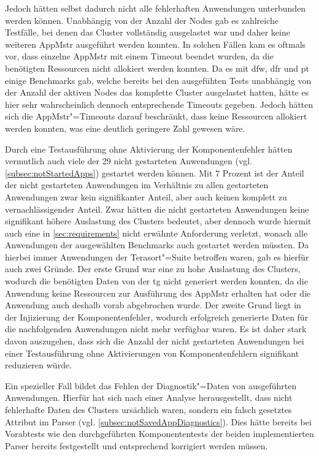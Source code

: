 Jedoch hätten selbst dadurch \uU nicht alle fehlerhaften Anwendungen unterbunden werden können.
Unabhängig von der Anzahl der Nodes gab es zahlreiche Testfälle, bei denen das Cluster vollständig ausgelastet war und daher keine weiteren \gls{AppMstr} ausgeführt werden konnten.
In solchen Fällen kam es oftmals vor, dass einzelne \gls{AppMstr} mit einem Timeout beendet wurden, da die benötigten Ressourcen nicht allokiert werden konnten.
Da es mit \acrlong{dfw}, \acrlong{dfr} und \acrlong{pt} einige Benchmarks gab, welche bereits bei den ausgefühten Tests unabhängig von der Anzahl der aktiven Nodes das komplette Cluster ausgelastet hatten, hätte es hier sehr wahrscheinlich dennoch entsprechende Timeouts gegeben.
Jedoch hätten sich die \gls{AppMstr}"=Timeouts darauf beschränkt, dass keine Ressourcen allokiert werden konnten, was eine deutlich geringere Zahl gewesen wäre.

Durch eine Testausführung ohne Aktivierung der Komponentenfehler hätten vermutlich auch viele der 29 nicht gestarteten Anwendungen (vgl. \cref{subsec:notStartedApps}) gestartet werden können.
Mit 7 Prozent ist der Anteil der nicht gestarteten Anwendungen im Verhältnis zu allen gestarteten Anwendungen zwar kein signifikanter Anteil, aber auch keinen komplett zu vernachlässigender Anteil.
Zwar hätten die nicht gestarteten Anwendungen keine signifikant höhere Auslastung des Clusters bedeutet, aber dennoch wurde hiermit auch eine in \cref{sec:requirements} nicht erwähnte Anforderung verletzt, wonach alle Anwendungen der ausgewählten Benchmarks auch gestartet werden müssten.
Da hierbei immer Anwendungen der Terasort"=Suite betroffen waren, gab es hierfür auch zwei Gründe.
Der erste Grund war eine zu hohe Auslastung des Clusters, wodurch die benötigten Daten von der \acrlong{tg} nicht generiert werden konnten, da die Anwendung keine Ressourcen zur Ausführung des \gls{AppMstr} erhalten hat oder die Anwendung auch deshalb vorab abgebrochen wurde.
Der zweite Grund liegt in der Injizierung der Komponentenfehler, wodurch erfolgreich generierte Daten für die nachfolgenden Anwendungen nicht mehr verfügbar waren.
Es ist daher stark davon auszugehen, dass sich die Anzahl der nicht gestarteten Anwendungen bei einer Testausführung ohne Aktivierungen von Komponentenfehlern signifikant reduzieren würde.

Ein spezieller Fall bildet das Fehlen der Diagnostik"=Daten von ausgeführten Anwendungen.
Hierfür hat sich nach einer Analyse herausgestellt, dass nicht fehlerhafte Daten des Clusters ursächlich waren, sondern ein falsch gesetztes Attribut im Parser (vgl. \cref{subsec:notSavedAppDiagnostics}).
Dies hätte bereits bei Vorabtests wie den durchgeführten Komponententests der beiden implementierten Parser bereits festgestellt und entsprechend korrigiert werden müssen.
